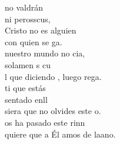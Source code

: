 \documentclass[12pt]{article}
\begin{document}
\begin{multicols*}{2}
\begin{cancion}
        \jump
             no valdrán \\
            ni perosscus, \\
             Cristo no es alguien \\
            con quien se ga.\\
             nuestro mundo no cia, \\
            solamen s cu  \\
            l que diciendo , luego rega.\\
        \jump
            ti que estás \\
            sentado enll  \\
            siera que no olvides este o.\\
            os ha pasado  este rinn \\
            quiere que a Él amos de laano.\\
        \end{cancion}%
        

\end{multicols*}
\end{document}
